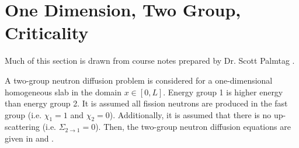 \section{One Dimension, Two Group, Criticality}
  \label{sec:deriv_1d2g}
  Much of this section is drawn from course notes prepared by Dr. Scott 
  Palmtag \cite{analytic2g}.
  
  A two-group neutron diffusion problem is considered for a one-dimensional
  homogeneous slab in the domain $x \in [0,L]$. Energy group 1 is higher energy
  than energy group 2. It is assumed all fission neutrons are  produced in the
  fast group (i.e. $\chi_1=1$ and $\chi_2=0$). Additionally, it is assumed that 
  there is no up-scattering  (i.e. $\Sigma_{2\rightarrow1}=0$).  Then, the
  two-group neutron diffusion equations are given in  and 
  .
  
